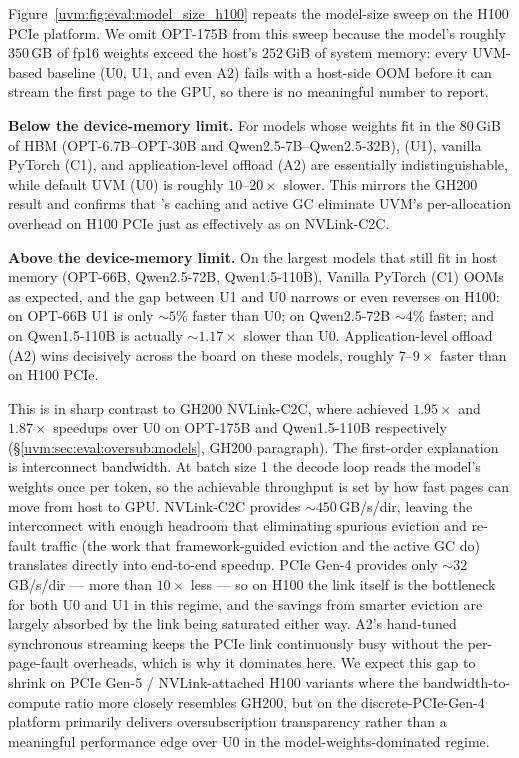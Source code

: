 Figure~\ref{uvm:fig:eval:model_size_h100} repeats the model-size sweep on the H100 PCIe platform.
We omit OPT-175B from this sweep
    because the model's roughly $350$\,GB of fp16 weights
    exceed the host's $252$\,GiB of system memory:
    every UVM-based baseline (U0, U1, and even A2) fails with a host-side OOM
    before it can stream the first page to the GPU,
    so there is no meaningful number to report.

\textbf{Below the device-memory limit.}
For models whose weights fit in the $80$\,GiB of HBM
    (OPT-6.7B--OPT-30B and Qwen2.5-7B--Qwen2.5-32B),
    {\uvmname} (U1), vanilla PyTorch (C1),
    and application-level offload (A2) are essentially indistinguishable,
    while default UVM (U0) is roughly $10$--$20\times$ slower.
This mirrors the GH200 result and confirms that
    {\uvmname}'s caching and active GC eliminate UVM's per-allocation overhead
    on H100 PCIe just as effectively as on NVLink-C2C.

\textbf{Above the device-memory limit.}
On the largest models that still fit in host memory
    (OPT-66B, Qwen2.5-72B, Qwen1.5-110B),
    Vanilla PyTorch (C1) OOMs as expected,
    and the gap between U1 and U0 narrows or even reverses on H100:
    on OPT-66B U1 is only $\sim$$5\%$ faster than U0;
    on Qwen2.5-72B $\sim$$4\%$ faster;
    and on Qwen1.5-110B {\uvmname} is actually $\sim$$1.17\times$ slower than U0.
Application-level offload (A2) wins decisively across the board on these models,
    roughly $7$--$9\times$ faster than {\uvmname} on H100 PCIe.

This is in sharp contrast to GH200 NVLink-C2C,
    where {\uvmname} achieved $1.95\times$ and $1.87\times$ speedups over U0
    on OPT-175B and Qwen1.5-110B respectively
    (\S\ref{uvm:sec:eval:oversub:models}, GH200 paragraph).
The first-order explanation is interconnect bandwidth.
At batch size 1 the decode loop reads the model's weights once per token,
    so the achievable throughput is set by how fast pages can move from host to GPU.
NVLink-C2C provides $\sim$$450$\,GB/s/dir,
    leaving the interconnect with enough headroom that
    eliminating spurious eviction and re-fault traffic
    (the work that framework-guided eviction and the active GC do)
    translates directly into end-to-end speedup.
PCIe Gen-4 provides only $\sim$$32$\,GB/s/dir
    --- more than $10\times$ less ---
    so on H100 the link itself is the bottleneck for both U0 and U1
    in this regime,
    and the savings from smarter eviction are largely absorbed
    by the link being saturated either way.
A2's hand-tuned synchronous streaming
    keeps the PCIe link continuously busy without the per-page-fault overheads,
    which is why it dominates here.
We expect this gap to shrink on PCIe Gen-5 / NVLink-attached H100 variants
    where the bandwidth-to-compute ratio more closely resembles GH200,
    but on the discrete-PCIe-Gen-4 platform
    {\uvmname} primarily delivers oversubscription transparency
    rather than a meaningful performance edge over U0
    in the model-weights-dominated regime.

